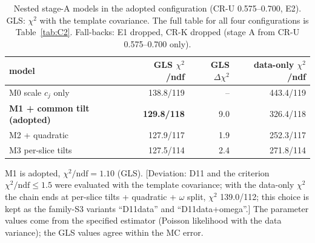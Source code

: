 \documentclass[11pt,a4paper]{article}
\newcommand{\flag}[1]{\textcolor{red!60!black}{[#1]}}
\begin{document}
\begin{table}[H]
\centering
\caption{Nested stage-A models in the adopted configuration (CR-U 0.575--0.700, E2). GLS: $\chi^2$ with the template covariance. The
full table for all four configurations is Table~\ref{tab:C2}. Fall-backs: E1 dropped, CR-K dropped (stage A from CR-U 0.575--0.700 only).}
\label{tab:d11}
\small
\begin{tabular}{@{}l r r r@{}}
\toprule
model & GLS $\chi^2$/ndf & GLS $\Delta\chi^2$ & data-only $\chi^2$/ndf \\
\midrule
M0 scale $c_j$ only & 138.8/119 & -- & 443.4/119 \\
\textbf{M1 + common tilt (adopted)} & \textbf{129.8/118} & 9.0 & 326.4/118 \\
M2 + quadratic & 127.9/117 & 1.9 & 252.3/117 \\
M3 per-slice tilts & 127.5/114 & 2.4 & 271.8/114 \\
\bottomrule
\end{tabular}
\end{table}

M1 is adopted, $\chi^2/\mathrm{ndf}=1.10$ (GLS). \flag{Deviation: D11 and the criterion $\chi^2/\mathrm{ndf}\le1.5$ were evaluated with
the template covariance; with the data-only $\chi^2$ the chain ends at per-slice tilts + quadratic + $\omega$ split, $\chi^2$ 139.0/112;
this choice is kept as the family-S3 variants ``D11data'' and ``D11data+omega''.} The parameter values come from the specified estimator
(Poisson likelihood with the data variance); the GLS values agree within the MC error.
\end{document}
